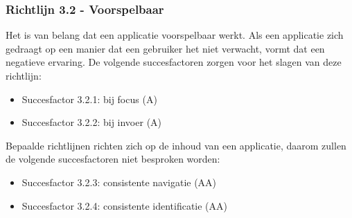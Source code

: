 \subsubsection{Richtlijn 3.2 - Voorspelbaar}
Het is van belang dat een applicatie voorspelbaar werkt. Als een applicatie zich gedraagt op een manier dat een gebruiker het niet verwacht, vormt dat een negatieve ervaring. De volgende succesfactoren zorgen voor het slagen van deze richtlijn:
\begin{itemize}
    \item Succesfactor 3.2.1: bij focus (A)
      \item Succesfactor 3.2.2: bij invoer (A)
\end{itemize}
Bepaalde richtlijnen richten zich op de inhoud van een applicatie, daarom zullen de volgende succesfactoren niet besproken worden: \begin{itemize}
    \item Succesfactor 3.2.3: consistente navigatie (AA)
    \item Succesfactor 3.2.4: consistente identificatie (AA)
\end{itemize}
\newpage
